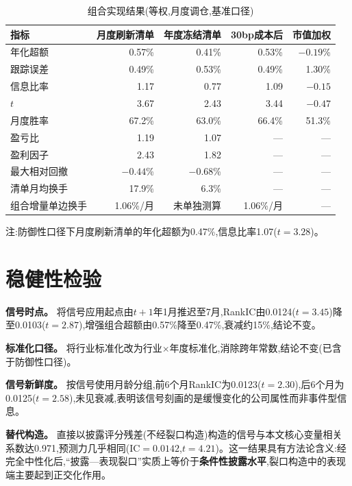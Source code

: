 \documentclass[UTF8, a4paper, fontset=fandol, zihao=-4]{ctexart}
\begin{document}
\begin{table}[H]
\centering
\begin{threeparttable}
\caption{组合实现结果(等权,月度调仓,基准口径)}\label{tab:port}
\begin{tabular}{lrrrr}
\toprule
指标 & 月度刷新清单 & 年度冻结清单 & 30bp成本后 & 市值加权 \\
\midrule
年化超额 & 0.57\% & 0.41\% & 0.53\% & $-0.19$\% \\
跟踪误差 & 0.49\% & 0.53\% & 0.49\% & 1.30\% \\
信息比率 & 1.17 & 0.77 & 1.09 & $-0.15$ \\
$t$ & 3.67 & 2.43 & 3.44 & $-0.47$ \\
月度胜率 & 67.2\% & 63.0\% & 66.4\% & 51.3\% \\
盈亏比 & 1.19 & 1.07 & — & — \\
盈利因子 & 2.43 & 1.82 & — & — \\
最大相对回撤 & $-0.44$\% & $-0.68$\% & — & — \\
清单月均换手 & 17.9\% & 6.3\% & — & — \\
组合增量单边换手 & 1.06\%/月 & 未单独测算 & 1.06\%/月 & — \\
\bottomrule
\end{tabular}
\begin{tablenotes}
\item 注:防御性口径下月度刷新清单的年化超额为0.47\%,信息比率1.07($t=3.28$)。
\end{tablenotes}
\end{threeparttable}
\end{table}

\section{稳健性检验}

\textbf{信号时点。} 将信号应用起点由$t+1$年1月推迟至7月,RankIC由0.0124($t=3.45$)降至0.0103($t=2.87$),增强组合超额由0.57\%降至0.47\%,衰减约15\%,结论不变。

\textbf{标准化口径。} 将行业标准化改为行业$\times$年度标准化,消除跨年常数,结论不变(已含于防御性口径)。

\textbf{信号新鲜度。} 按信号使用月龄分组,前6个月RankIC为0.0123($t=2.30$),后6个月为0.0125($t=2.58$),未见衰减,表明该信号刻画的是缓慢变化的公司属性而非事件型信息。

\textbf{替代构造。} 直接以披露评分残差(不经裂口构造)构造的信号与本文核心变量相关系数达0.971,预测力几乎相同(IC${}=0.0142$,$t=4.21$)。这一结果具有方法论含义:经完全中性化后,“披露—表现裂口”实质上等价于\textbf{条件性披露水平},裂口构造中的表现端主要起到正交化作用。
\end{document}

